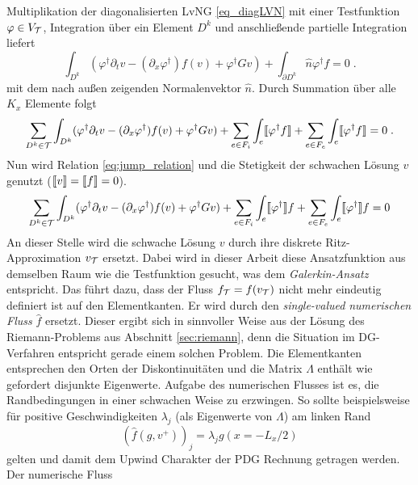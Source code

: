 Multiplikation der diagonalisierten LvNG \eqref{eq_diagLVN} mit einer Testfunktion $\varphi\in V_{\mathcal{T}}$, Integration über ein Element $D^k$ und anschließende partielle Integration liefert
\begin{equation*}
  \int_{D^k} (\varphi^{\dagger} \partial_t v - (\partial_x \varphi^{\dagger}) f(v) + \varphi^{\dagger} G v) + \int_{\partial D^k}\hat{n}\varphi^{\dagger}f = 0 \; .
\end{equation*}
mit dem nach außen zeigenden Normalenvektor $\hat{n}$. Durch Summation über alle $K_x$ Elemente folgt
\begin{equation*}
  \sum_{D^k\in\mathcal{T}}\int_{D^k} (\varphi^{\dagger} \partial_t v - (\partial_x \varphi^{\dagger}) f(v) + \varphi^{\dagger} G v)
  + \sum_{e\in F_i}\int_{e}\llbracket \varphi^{\dagger}f \rrbracket + \sum_{e\in F_e}\int_e \llbracket \varphi^{\dagger}f \rrbracket  = 0 \; .
\end{equation*}
Nun wird Relation \eqref{eq:jump_relation} und die Stetigkeit der schwachen Lösung $v$ genutzt (${\llbracket v \rrbracket=\llbracket f \rrbracket=0}$).
\begin{equation}
  \sum_{D^k\in\mathcal{T}}\int_{D^k} (\varphi^{\dagger} \partial_t v - (\partial_x \varphi^{\dagger}) f(v) + \varphi^{\dagger} G v)
  + \sum_{e\in F_i}\int_{e}\llbracket \varphi^{\dagger} \rrbracket f + \sum_{e\in F_e}\int_e \llbracket \varphi^{\dagger} \rrbracket f  = 0
  \label{eq:kontinForm}
\end{equation}
An dieser Stelle wird die schwache Lösung $v$ durch ihre diskrete Ritz-Approximation $v_{\mathcal{T}}$ ersetzt. Dabei wird in dieser Arbeit diese Ansatzfunktion aus demselben Raum wie die Testfunktion gesucht, was dem \emph{Galerkin-Ansatz} entspricht. Das führt dazu, dass der Fluss $f_{\mathcal{T}} = f(v_{\mathcal{T}})$ nicht mehr eindeutig definiert ist auf den Elementkanten. Er wird durch den \emph{single-valued} \emph{numerischen Fluss} $\hat{f}$ ersetzt. Dieser ergibt sich in sinnvoller Weise aus der Lösung des Riemann-Problems aus Abschnitt \ref{sec:riemann}, denn die Situation im DG-Verfahren entspricht gerade einem solchen Problem. Die Elementkanten entsprechen den Orten der Diskontinuitäten und die Matrix $\Lambda$ enthält wie gefordert disjunkte Eigenwerte.
Aufgabe des numerischen Flusses ist es, die Randbedingungen in einer schwachen Weise zu erzwingen. So sollte beispielsweise für positive Geschwindigkeiten $\lambda_j$ (als Eigenwerte von $\Lambda$) am linken Rand
\begin{equation*}
  (\hat{f}(g, v^+))_j = \lambda_j g(x=-L_x/2)
\end{equation*}
gelten und damit dem Upwind Charakter der PDG Rechnung getragen werden. Der numerische Fluss
